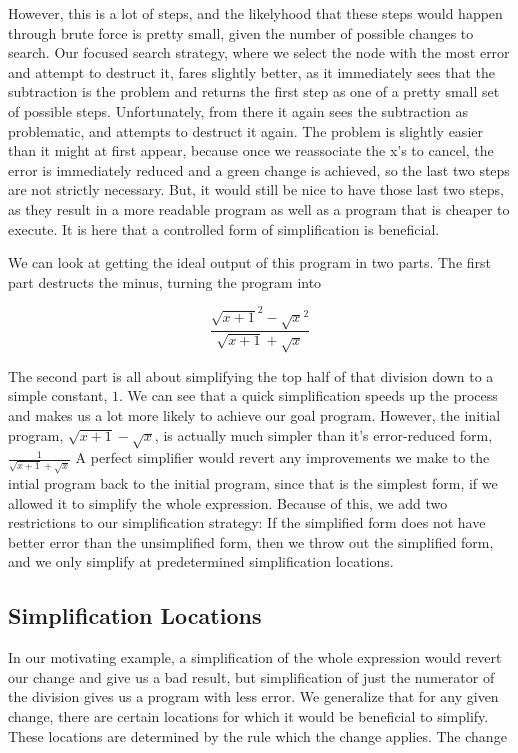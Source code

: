 \documentclass{article}
\newcommand{\sqrsqrt}[1]{\sqrt{#1}^2}
\begin{document}
However, this is a lot of steps, 
and the likelyhood that these steps 
would happen through brute force 
is pretty small, 
given the number of possible 
changes to search. 
Our focused search strategy, 
where we select the node 
with the most error 
and attempt to destruct it, 
fares slightly better, 
as it immediately sees that the subtraction is the problem 
and returns the first step as one 
of a pretty small set of possible steps. 
Unfortunately, 
from there it again sees the subtraction as problematic, 
and attempts to destruct it again. 
The problem is slightly easier than it might at first appear, 
because once we reassociate the x's to cancel, 
the error is immediately reduced 
and a green change is achieved, 
so the last two steps are not strictly necessary. 
But, it would still be nice to have those last two steps, 
as they result in a more readable program 
as well as a program that is cheaper to execute. 
It is here that a controlled form 
of simplification is beneficial.

We can look at getting the ideal output
 of this program 
in two parts. 
The first part destructs the minus, 
turning the program into

\[\frac{\sqrsqrt{x + 1} - \sqrsqrt{x}}{\sqrt{x + 1} + \sqrt{x}}\]

The second part is all about simplifying 
the top half of that division 
down to a simple constant, 
$1$. 
We can see 
that a quick simplification 
speeds up the process 
and makes us a lot more likely 
to achieve our goal program. 
However, the initial program, 
$\sqrt{x + 1} - \sqrt{x}$, 
is actually much simpler 
than it's error-reduced form,
$\frac{1}{\sqrt{x + 1} + \sqrt{x}}$
A perfect simplifier 
would revert any improvements we make 
to the intial program 
back to the initial program, 
since that is the simplest form, 
if we allowed it to simplify the whole expression. 
Because of this, 
we add two restrictions 
to our simplification strategy: 
If the simplified form 
does not have better error 
than the unsimplified form, 
then we throw out 
the simplified form, 
and we only simplify 
at predetermined simplification locations.

\subsection{Simplification Locations}

In our motivating example, 
a simplification of the whole expression 
would revert our change 
and give us a bad result, 
but simplification of just the numerator 
of the division gives us a program with less error. 
We generalize that for any given change, 
there are certain locations 
for which it would be beneficial to simplify. 
These locations are determined 
by the rule which the change applies. 
The change
\end{document}
